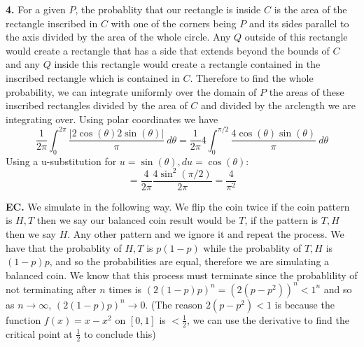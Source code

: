 \documentclass[12pt]{article}
\newenvironment{ques}{\vspace{2 ex}}{\vspace{2 ex}}
\theoremstyle{definition}
\begin{document}
\begin{ques}
	\textbf{4.} 
		For a given $P$, the probablity that our rectangle is inside
		$C$ is the area of the rectangle inscribed in $C$ with one of
		the corners being $P$ and its sides parallel to the axis
		divided by the area of the whole circle. Any
		$Q$ outside of this rectangle would create a rectangle that has
		a side that extends beyond the bounds of $C$ and any $Q$ inside
		this rectangle would create a rectangle contained in the
		inscribed rectangle which is contained in $C$. Therefore to
		find the whole probability, we can integrate uniformly over the
		domain of $P$ the areas of these inscribed rectangles divided
		by the area of $C$ and divided by the arclength we are
		integrating over. Using polar coordinates we have
		$$\frac{1}{2\pi}\int_{0}^{2\pi} \frac{|2\cos(\theta)2\sin(\theta)|}{\pi} \ d
		\theta = \frac{1}{2\pi}4\int_{0}^{\pi/2}
		\frac{4\cos(\theta)\sin(\theta)}{\pi} \ d \theta$$
		Using a u-substitution for $u = \sin(\theta), du =
		\cos(\theta)$:
		$$= \frac{4}{2\pi}\frac{4\sin^2(\pi/2)}{2\pi} = \frac{4}{\pi ^ 2}$$
\end{ques}

\begin{ques}
	\textbf{EC.}  %
		We simulate in the following way. We flip the coin twice if the
		coin pattern is $H,T$ then we say our balanced coin result
		would be $T$, if the pattern is $T,H$ then we say $H$. Any
		other pattern and we ignore it and repeat the process. We have
		that the probablity of $H, T$ is $p(1-p)$ while the probablity
		of $T,H$ is $(1-p)p$, and so the probabilities are equal,
		therefore we are simulating a balanced coin. We know that this
		process must terminate since the probablility of not
		terminating after $n$ times is $(2(1-p)p)^n = (2(p - p^2))^n <
		1^n$ and so as $n \to \infty$, $(2(1-p)p)^n \to 0$. (The reason
		$2(p - p^2) < 1$ is because the function $f(x) = x - x^2$ on
		$[0,1]$ is $<\frac{1}{2}$, we can use the derivative to find
		the critical point at $\frac{1}{2}$ to conclude this)

\end{ques}
\end{document}
